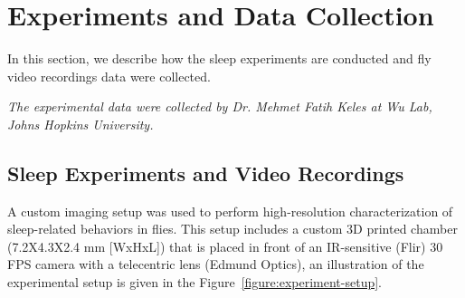\setlength{\parindent}{0pt}
\chapter{Experiments and Data Collection}\label{chapter:expt-data-collection}
In this section, we describe how the sleep experiments are conducted and fly video recordings data were collected.

\textit{The experimental data were collected by Dr. Mehmet Fatih Keles at Wu Lab, Johns Hopkins University.}

\section{Sleep Experiments and Video Recordings}
A custom imaging setup was used to perform high-resolution characterization of sleep-related behaviors in flies.
This setup includes a custom 3D printed chamber (7.2X4.3X2.4 mm [WxHxL]) that is placed in front of an IR-sensitive (Flir) 30 FPS camera with a telecentric lens (Edmund Optics), an illustration of the experimental setup is given in the Figure~\ref{figure:experiment-setup}.

